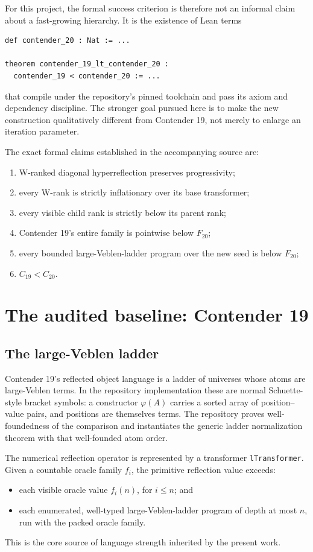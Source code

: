 \documentclass[11pt]{article}
\theoremstyle{definition}
\newcommand{\code}[1]{\texttt{#1}}
\newcommand{\Cnineteen}{C_{19}}
\newcommand{\Ctwenty}{C_{20}}
\begin{document}
For this project, the formal success criterion is therefore not an informal
claim about a fast-growing hierarchy.  It is the existence of Lean terms
\begin{lstlisting}
def contender_20 : Nat := ...

theorem contender_19_lt_contender_20 :
  contender_19 < contender_20 := ...
\end{lstlisting}
that compile under the repository's pinned toolchain and pass its axiom and
dependency discipline.  The stronger goal pursued here is to make the new
construction qualitatively different from Contender 19, not merely to enlarge
an iteration parameter.

The exact formal claims established in the accompanying source are:
\begin{enumerate}[label=(\roman*),leftmargin=2.2em]
  \item W-ranked diagonal hyperreflection preserves progressivity;
  \item every W-rank is strictly inflationary over its base transformer;
  \item every visible child rank is strictly below its parent rank;
  \item Contender 19's entire family is pointwise below \(F_{20}\);
  \item every bounded large-Veblen-ladder program over the new seed is below
        \(F_{20}\);
  \item \(\Cnineteen < \Ctwenty\).
\end{enumerate}

\section{The audited baseline: Contender 19}

\subsection{The large-Veblen ladder}

Contender 19's reflected object language is a ladder of universes whose atoms
are large-Veblen terms.  In the repository implementation these are normal
Schuette-style bracket symbols: a constructor \(\varphi(A)\) carries a sorted
array of position--value pairs, and positions are themselves terms.  The
repository proves well-foundedness of the comparison and instantiates the
generic ladder normalization theorem with that well-founded atom order.

The numerical reflection operator is represented by a transformer
\code{lTransformer}.  Given a countable oracle family \(f_i\), the primitive
reflection value exceeds:
\begin{itemize}[leftmargin=2em]
  \item each visible oracle value \(f_i(n)\), for \(i\leq n\); and
  \item each enumerated, well-typed large-Veblen-ladder program of depth at
        most \(n\), run with the packed oracle family.
\end{itemize}
This is the core source of language strength inherited by the present work.
\end{document}
